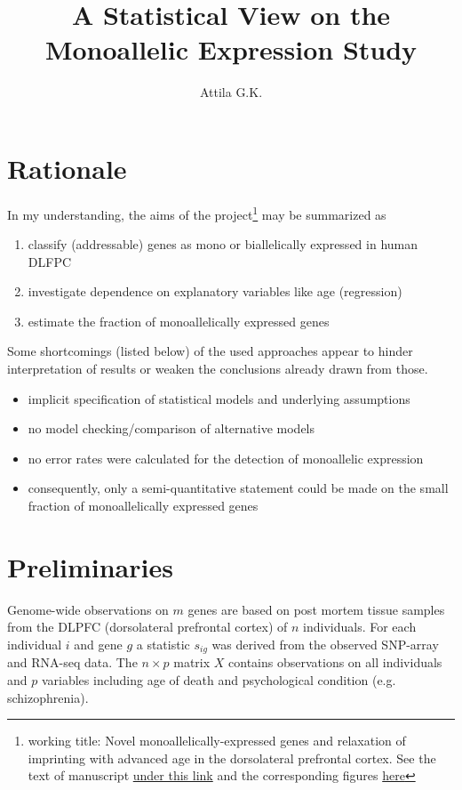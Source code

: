 \documentclass[letterpaper]{article}
\title{A Statistical View on the Monoallelic Expression Study}
\author{Attila G.K.}
\begin{document}
\maketitle

\section{Rationale}

In my understanding, the aims of the project\footnote{working title: Novel
monoallelically-expressed genes and relaxation of imprinting with advanced age
in the dorsolateral prefrontal cortex.  See the text of manuscript
\href{https://docs.google.com/document/d/1cWd4UH98SJR5lihDihC0ZO-C_A1-8MQ5COcixxCLzHE/edit?usp=sharing}{under
this link}
and the corresponding figures
\href{https://docs.google.com/presentation/d/1YvpA1AJ-zzir1Iw0F25tO9x8gkSAzqaO4fjB7K3zBhE/edit?usp=sharing}{here}}
may be summarized as
\begin{enumerate}
\item classify (addressable) genes as mono or biallelically expressed in human DLFPC
\item investigate dependence on explanatory variables like age (regression)
\item estimate the fraction of monoallelically expressed genes 
\end{enumerate}

Some shortcomings (listed below) of the used approaches appear to hinder interpretation of results or
weaken the conclusions already drawn from those.
\begin{itemize}
\item implicit specification of statistical models and underlying assumptions
\item no model checking/comparison of alternative models
\item no error rates were calculated for the detection of monoallelic expression
\item consequently, only a semi-quantitative statement could be made on the
small fraction of monoallelically expressed genes
\end{itemize}

\section{Preliminaries}

Genome-wide observations on $m$ genes are based on post mortem tissue samples from the DLPFC
(dorsolateral prefrontal cortex) of $n$ individuals.  For each individual $i$ and gene $g$ a
statistic $s_{ig}$ was derived from the observed SNP-array and RNA-seq data.  The $n \times p$
matrix $X$ contains observations on all individuals and $p$ variables including age of death and
psychological condition (e.g. schizophrenia).
\end{document}
